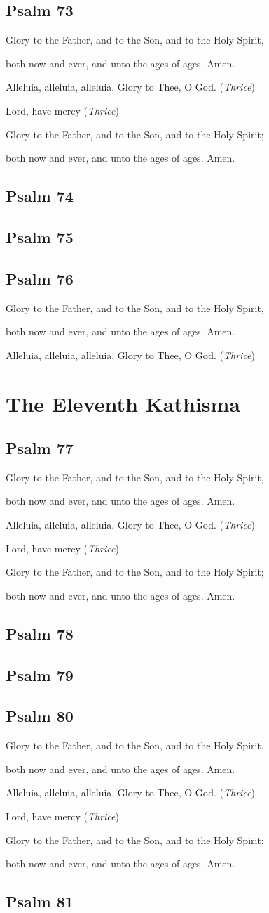 \documentclass[12pt,openany]{book}
\newcommand{\kathismabreak}{
  \medskip
  \begin{center}
  \begin{footnotesize}
  Glory to the Father, and to the Son, and to the Holy Spirit,
  
  both now and ever, and unto the ages of ages. Amen.

  Alleluia, alleluia, alleluia. Glory to Thee, O God. (\textit{Thrice})

  Lord, have mercy (\textit{Thrice})

  Glory to the Father, and to the Son, and to the Holy Spirit;
  
  both now and ever, and unto the ages of ages. Amen.
  \end{footnotesize}
  \end{center}
  \smallbreak
}
\newcommand{\kathismaend}{
  \medskip
  \begin{center}
  \begin{footnotesize}
  Glory to the Father, and to the Son, and to the Holy Spirit,
  
  both now and ever, and unto the ages of ages. Amen.

  Alleluia, alleluia, alleluia. Glory to Thee, O God. (\textit{Thrice})
  \end{footnotesize}
  \end{center}
  \smallbreak
}
\begin{document}
\section{Psalm 73}


\kathismabreak
\smallskip

\section{Psalm 74}

\smallskip
\section{Psalm 75}

\smallskip
\section{Psalm 76}


\kathismaend

\chapter*{The Eleventh Kathisma}
\smallskip
\section{Psalm 77}


\pagebreak %
\kathismabreak
\smallskip

\section{Psalm 78}

\smallskip
\section{Psalm 79}

\bigskip
\section{Psalm 80}


\pagebreak %
\kathismabreak
\smallskip

\section{Psalm 81}

\smallskip
\end{document}
